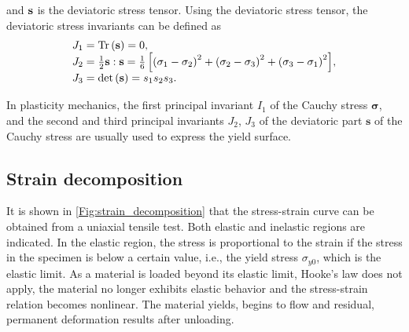 and $\bf{s}$ is the deviatoric stress tensor.
Using the deviatoric stress tensor, the deviatoric stress invariants can be defined as
\begin{equation}
\begin{array}{*{20}{l}}
{{J_1} = {\rm{Tr}}\left( {\bf{s}} \right) = 0},\\
{{J_2} = \frac{1}{2}{\bf{s}}:{\bf{s}} = \frac{1}{6}\left[ {{{\left( {{\sigma _1} - {\sigma _2}} \right)}^2} + {{\left( {{\sigma _2} - {\sigma _3}} \right)}^2} + {{\left( {{\sigma _3} - {\sigma _1}} \right)}^2}} \right]},\\
{{J_3} = \det \left( {\bf{s}} \right) = {s_1}{s_2}{s_3}}.
\end{array}
\end{equation}

In plasticity mechanics, the first principal invariant $I_1$ of the Cauchy stress $\boldsymbol{\sigma}$, and the second and third principal invariants $J_2$, $J_3$ of the deviatoric part $\boldsymbol{s}$ of the Cauchy stress are usually used to express the yield surface.


\subsection{Strain decomposition}
\noindent
It is shown in \ref{Fig:strain_decomposition} that the stress-strain curve can be obtained from a uniaxial tensile test.
Both elastic and inelastic regions are indicated.
In the elastic region, the stress is proportional to the strain if the stress in the specimen is below a certain value, i.e., the yield stress $\sigma_{y0}$, which is the elastic limit.
As a material is loaded beyond its elastic limit, Hooke's law does not apply, the material no longer exhibits elastic behavior and the stress-strain relation becomes nonlinear. The material yields, begins to flow and residual, permanent deformation results after unloading.


